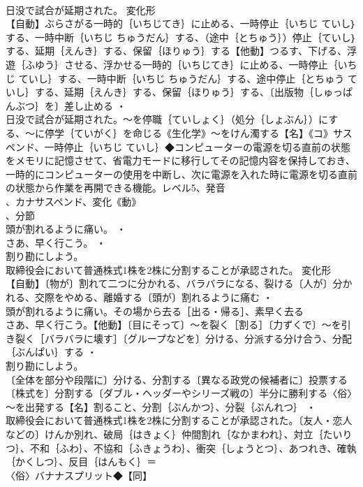 \documentclass[8pt]{extreport}
\begin{document}
\begin{CJK}{UTF8}{min}
\\	日没で試合が延期された。	変化形 
\\	【自動】ぶらさがる一時的｛いちじてき｝に止める、一時停止｛いちじ ていし｝する、一時中断｛いちじ ちゅうだん｝する、（途中｛とちゅう｝）停止｛ていし｝する、延期｛えんき｝する、保留｛ほりゅう｝する【他動】つるす、下げる、浮遊｛ふゆう｝させる、浮かせる一時的｛いちじてき｝に止める、一時停止｛いちじ ていし｝する、一時中断｛いちじ ちゅうだん｝する、途中停止｛とちゅう ていし｝する、延期｛えんき｝する、保留｛ほりゅう｝する、〔出版物｛しゅっぱんぶつ｝を〕差し止める ・
\\	日没で試合が延期された。～を停職｛ていしょく｝（処分｛しょぶん｝）にする、～に停学｛ていがく｝を命じる《生化学》～をけん濁する【名】《コ》サスペンド、一時停止｛いちじ ていし｝◆コンピューターの電源を切る直前の状態をメモリに記憶させて、省電力モードに移行してその記憶内容を保持しておき、一時的にコンピューターの使用を中断し、次に電源を入れた時に電源を切る直前の状態から作業を再開できる機能。レベル5、発音
\\	、カナサスペンド、変化《動》
\\	、分節
\\	頭が割れるように痛い。 ・
\\	さあ、早く行こう。 ・
\\	割り勘にしよう。
\\	取締役会において普通株式1株を2株に分割することが承認された。	変化形 
\\	【自動】〔物が〕割れて二つに分かれる、バラバラになる、裂ける〔人が〕分かれる、交際をやめる、離婚する〔頭が〕割れるように痛む ・
\\	頭が割れるように痛い。その場から去る［出る・帰る］、素早く去る
\\	さあ、早く行こう。【他動】〔目にそって〕～を裂く［割る］〔力ずくで〕～を引き裂く［バラバラに壊す］〔グループなどを〕分ける、分派する分け合う、分配｛ぶんぱい｝する ・
\\	割り勘にしよう。
\\	〔全体を部分や段階に〕分ける、分割する〔異なる政党の候補者に〕投票する〔株式を〕分割する〔ダブル・ヘッダーやシリーズ戦の〕半分に勝利する〈俗〉～を出発する【名】割ること、分割｛ぶんかつ｝、分裂｛ぶんれつ｝ ・
\\	取締役会において普通株式1株を2株に分割することが承認された。〔友人・恋人などの〕けんか別れ、破局｛はきょく｝仲間割れ｛なかまわれ｝、対立｛たいりつ｝、不和｛ふわ｝、不協和｛ふきょうわ｝、衝突｛しょうとつ｝、あつれき、確執｛かくしつ｝、反目｛はんもく｝＝ 
\\	〈俗〉バナナスプリット◆【同】

\end{CJK}
\end{document}
